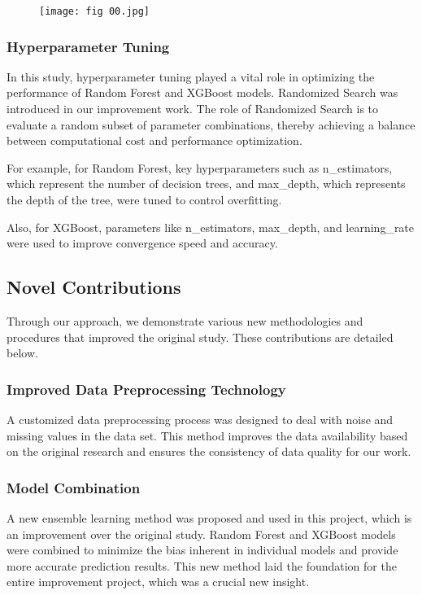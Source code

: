 \documentclass[conference]{IEEEtran}
\begin{document}
\begin{figure}[h]
    \centering
    \texttt{[image: fig 00.jpg]}
\end{figure}


\subsubsection{Hyperparameter Tuning}

In this study, hyperparameter tuning played a vital role in optimizing the performance of Random Forest and XGBoost models. Randomized Search was introduced in our improvement work. The role of Randomized Search is to evaluate a random subset of parameter combinations, thereby achieving a balance between computational cost and performance optimization. 

For example, for Random Forest, key hyperparameters such as n\_estimators, which represent the number of decision trees, and max\_depth, which represents the depth of the tree, were tuned to control overfitting. 

Also, for XGBoost, parameters like n\_estimators, max\_depth, and learning\_rate were used to improve convergence speed and accuracy. 


\subsection{Novel Contributions}

Through our approach, we demonstrate various new methodologies and procedures that improved the original study. These contributions are detailed below.

\subsubsection{Improved Data Preprocessing Technology}

A customized data preprocessing process was designed to deal with noise and missing values in the data set. This method improves the data availability based on the original research and ensures the consistency of data quality for our work.

\subsubsection{Model Combination}

A new ensemble learning method was proposed and used in this project, which is an improvement over the original study. Random Forest and XGBoost models were combined to minimize the bias inherent in individual models and provide more accurate prediction results. This new method laid the foundation for the entire improvement project, which was a crucial new insight.
\end{document}
